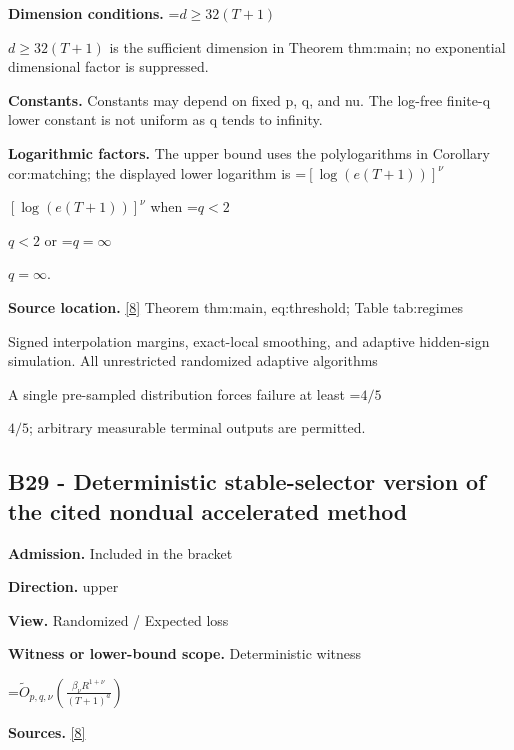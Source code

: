 \documentclass[10pt,a4paper]{article}
\newcommand{\AtlasMath}[1]{\par\begingroup\centering\setbox0=\hbox{$\displaystyle #1$}\ifdim\wd0>1.4\linewidth\typeout{ATLAS WIDE FORMULA: \the\wd0}\fi\ifdim\wd0>\linewidth\resizebox{\linewidth}{!}{\box0}\else\box0\fi\par\endgroup}
\newcommand{\AtlasInlineMath}[1]{\begingroup\setbox0=\hbox{$#1$}\ifdim\wd0>.4\linewidth\endgroup\AtlasMath{#1}\else\endgroup$#1$\fi}
\begin{document}
\textbf{Dimension conditions.} \AtlasInlineMath{d\ge32(T+1)} is the sufficient dimension in Theorem thm:main; no exponential dimensional factor is suppressed.



\textbf{Constants.} Constants may depend on fixed p, q, and nu. The log-free finite-q lower constant is not uniform as q tends to infinity.



\textbf{Logarithmic factors.} The upper bound uses the polylogarithms in Corollary cor:matching; the displayed lower logarithm is \AtlasInlineMath{[\log(e(T+1))]^\nu} when \AtlasInlineMath{q<2} or \AtlasInlineMath{q=\infty}.



\textbf{Source location.} \href{https://github.com/WU-Wendao/Colombo/blob/main/colombo_sensorium/Complexity_altas/data/sources/colombo/B1/manuscript.pdf}{[8]} Theorem thm:main, eq:threshold; Table tab:regimes



Signed interpolation margins, exact-local smoothing, and adaptive hidden-sign simulation. All unrestricted randomized adaptive algorithms



A single pre-sampled distribution forces failure at least \AtlasInlineMath{4/5}; arbitrary measurable terminal outputs are permitted.



\subsection{B29 - Deterministic stable-selector version of the cited nondual accelerated method}


\textbf{Admission.} Included in the bracket



\textbf{Direction.} upper



\textbf{View.} Randomized / Expected loss



\textbf{Witness or lower-bound scope.} Deterministic witness



\AtlasMath{\widetilde O_{p,q,\nu}\!\left(\frac{\beta_\nu R^{1+\nu}}{(T+1)^a}\right)}


\textbf{Sources.} \href{https://github.com/WU-Wendao/Colombo/blob/main/colombo_sensorium/Complexity_altas/data/sources/colombo/B1/manuscript.pdf}{[8]}
\end{document}
